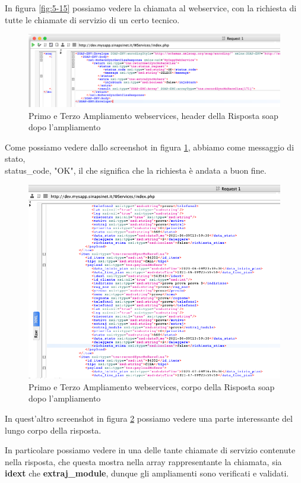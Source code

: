 	In figura \ref{fig:5-15} possiamo vedere la chiamata al webservice, con la richiesta di tutte le chiamate di servizio di un certo tecnico.


\begin{figure}[!h] 
	\centering
	\includegraphics[scale = 0.5]{immagini/webservices/ampliamenti/accettazione/3ampl__risposta_soap_header.png}
	\caption{Primo e Terzo Ampliamento webservices, header della Risposta \gls{soap} dopo l'ampliamento}
	\label{fig:5-16}
\end{figure}


	Come possiamo vedere dallo screenshot in figura \ref{fig:5-16}, abbiamo come messaggio di stato, \\status\_code, "OK", il che significa che la richiesta è andata a buon fine.

\newpage
\begin{figure}[!h] 
	\centering
	\includegraphics[scale = 0.5]{immagini/webservices/ampliamenti/accettazione/3ampl__risposta_soap_singola-chiamata.png}
	\caption{Primo e Terzo Ampliamento webservices, corpo della Risposta \gls{soap} dopo l'ampliamento}
	\label{fig:5-17}
\end{figure}


	In quest'altro screenshot in figura \ref{fig:5-17} possiamo vedere una parte interessante del lungo corpo della risposta.
	\newspace
	
	In particolare possiamo vedere in una delle tante chiamate di servizio contenute nella risposta, che questa mostra nella array rappresentante la chiamata, sia \textbf{idext} che \textbf{extraj\_module}, dunque gli ampliamenti sono verificati e validati.
